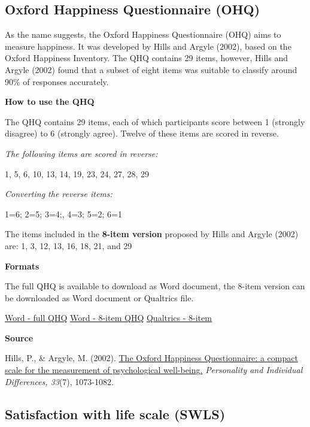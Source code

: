 \documentclass[
]{book}
\begin{document}
\hypertarget{oxford-happiness-questionnaire-ohq}{%
\subsection{Oxford Happiness Questionnaire (OHQ)}\label{oxford-happiness-questionnaire-ohq}}

As the name suggests, the Oxford Happiness Questionnaire (OHQ) aims to measure happiness. It was developed by Hills and Argyle (2002), based on the Oxford Happiness Inventory. The QHQ contains 29 items, however, Hills and Argyle (2002) found that a subset of eight items was suitable to classify around 90\% of responses accurately.

\textbf{How to use the QHQ}

The QHQ contains 29 items, each of which participants score between 1 (strongly disagree) to 6 (strongly agree). Twelve of these items are scored in reverse.

\emph{The following items are scored in reverse:}

1, 5, 6, 10, 13, 14, 19, 23, 24, 27, 28, 29

\emph{Converting the reverse items:}

1=6; 2=5; 3=4;, 4=3; 5=2; 6=1

The items included in the \textbf{8-item version} proposed by Hills and Argyle (2002) are: 1, 3, 12, 13, 16, 18, 21, and 29

\textbf{Formats}

The full QHQ is available to download as Word document, the 8-item version can be downloaded as Word document or Qualtrics file.

\href{questionnaires/OxfordHappinessQuestionnaire.docx}{Word - full QHQ} \textbar{} \href{questionnaires/OxfordHappinessQuestionnaire_8ItemVersion.docx}{Word - 8-item QHQ} \textbar{} \href{questionnaires/OxfordHappinessQuestionnaire_8ItemVersion.qsf}{Qualtrics - 8-item}

\textbf{Source}

Hills, P., \& Argyle, M. (2002). \href{https://pdfs.semanticscholar.org/cadd/7a4eea79e031ec0cf8b8054f668057f33dda.pdf}{The Oxford Happiness Questionnaire: a compact scale for the measurement of psychological well-being.} \emph{Personality and Individual Differences, 33}(7), 1073-1082.

\hypertarget{satisfaction-with-life-scale-swls}{%
\subsection{Satisfaction with life scale (SWLS)}\label{satisfaction-with-life-scale-swls}}
\end{document}
